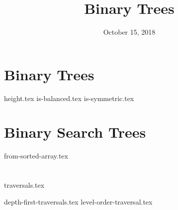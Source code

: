 \documentclass[11pt]{exam}
\title{Binary Trees}
\date{October 15, 2018}
\begin{document}
\maketitle

\section{Binary Trees}
\begin{questions}
{height.tex}
{is-balanced.tex}
\clearpage
{}\vspace*{-2em}
{is-symmetric.tex}
\end{questions}

\clearpage

\section{Binary Search Trees}
\begin{questions}
{from-sorted-array.tex}
\end{questions}

\clearpage


\section{}
{traversals.tex}
\begin{questions}
{depth-first-traversals.tex}
{level-order-traversal.tex}
\end{questions}
\end{document}
